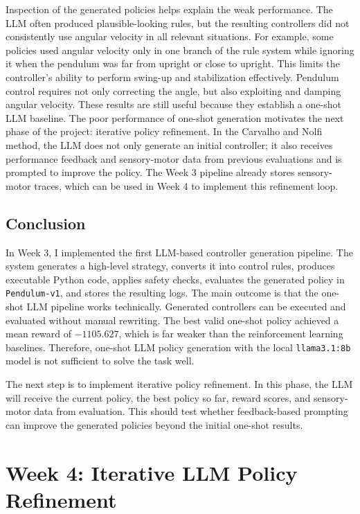 \documentclass[11pt,a4paper]{article}
\begin{document}
Inspection of the generated policies helps explain the weak performance. The LLM often produced plausible-looking rules, but the resulting controllers did not consistently use angular velocity in all relevant situations. For example, some policies used angular velocity only in one branch of the rule system while ignoring it when the pendulum was far from upright or close to upright. This limits the controller's ability to perform swing-up and stabilization effectively. Pendulum control requires not only correcting the angle, but also exploiting and damping angular velocity.
These results are still useful because they establish a one-shot LLM baseline. The poor performance of one-shot generation motivates the next phase of the project: iterative policy refinement. In the Carvalho and Nolfi method, the LLM does not only generate an initial controller; it also receives performance feedback and sensory-motor data from previous evaluations and is prompted to improve the policy. The Week 3 pipeline already stores sensory-motor traces, which can be used in Week 4 to implement this refinement loop.

\subsection{Conclusion}

In Week 3, I implemented the first LLM-based controller generation pipeline. The system generates a high-level strategy, converts it into control rules, produces executable Python code, applies safety checks, evaluates the generated policy in \texttt{Pendulum-v1}, and stores the resulting logs.
The main outcome is that the one-shot LLM pipeline works technically. Generated controllers can be executed and evaluated without manual rewriting. The best valid one-shot policy achieved a mean reward of $-1105.627$, which is far weaker than the reinforcement learning baselines. Therefore, one-shot LLM policy generation with the local \texttt{llama3.1:8b} model is not sufficient to solve the task well.

The next step is to implement iterative policy refinement. In this phase, the LLM will receive the current policy, the best policy so far, reward scores, and sensory-motor data from evaluation. This should test whether feedback-based prompting can improve the generated policies beyond the initial one-shot results.

\section{Week 4: Iterative LLM Policy Refinement}
\end{document}

